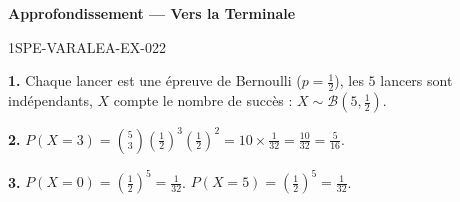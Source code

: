 \begin{center}\textbf{Approfondissement — Vers la Terminale}\end{center}
\begin{corrige}{1SPE-VARALEA-EX-022}

\textbf{1.} Chaque lancer est une épreuve de Bernoulli ($p = \frac{1}{2}$), les $5$ lancers sont indépendants, $X$ compte le nombre de succès : $X \sim \mathcal{B}(5, \frac{1}{2})$.

\medskip
\textbf{2.} $P(X=3) = \binom{5}{3}\left(\frac{1}{2}\right)^3\left(\frac{1}{2}\right)^2 = 10 \times \frac{1}{32} = \frac{10}{32} = \frac{5}{16}$.

\medskip
\textbf{3.} $P(X=0) = \left(\frac{1}{2}\right)^5 = \frac{1}{32}$. \quad $P(X=5) = \left(\frac{1}{2}\right)^5 = \frac{1}{32}$.

\end{corrige}

